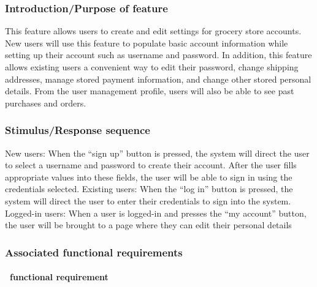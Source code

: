 \documentclass{scrreprt}
\theoremstyle{funreq}
\begin{document}
\subsubsection{Introduction/Purpose of feature}
This feature allows users to create and edit settings for grocery store accounts.  New users will use this feature to populate basic account information while setting up their account such as username and password.  In addition, this feature allows existing users a convenient way to edit their password, change shipping addresses, manage stored payment information, and change other stored personal details.  From the user management profile, users will also be able to see past purchases and orders.

\subsubsection{Stimulus/Response sequence}
\indent New users: When the “sign up” button is pressed, the system will direct the user to select a username and password to create their account.  After the user fills appropriate values into these fields, the user will be able to sign in using the credentials selected.
Existing users: When the “log in” button is pressed, the system will direct the user to enter their credentials to sign into the system.  
Logged-in users: When a user is logged-in and presses the “my account” button, the user will be brought to a page where they can edit their personal details

\subsubsection{Associated functional requirements}
\paragraph[]{\Subsectionname ~functional requirement }
\end{document}
